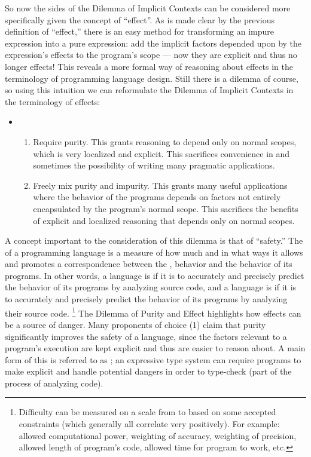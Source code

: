 So now the sides of the Dilemma of Implicit Contexts can be considered more specifically given the concept of ``effect''.
As is made clear by the previous definition of ``effect,'' there is an easy method for transforming an impure expression into a pure expression: add the implicit factors depended upon by the expression's effects to the program's scope --- now they are explicit and thus no longer effects!
This reveals a more formal way of reasoning about effects in the terminology of programming language design.
Still there is a dilemma of course, so using this intuition we can reformulate the Dilemma of Implicit Contexts in the terminology of effects:

\begin{itemize}
\item[] 
\begin{enumerate}
  \item[(1)]
  Require purity.
  This grants reasoning to depend only on normal scopes, which is very localized and explicit.
  This sacrifices convenience in and sometimes the possibility of writing many pragmatic applications.

  \item[(2)]
  Freely mix purity and impurity.
  This grants many useful applications where the behavior of the programs depends on factors not entirely encapsulated by the program's normal scope.
  This sacrifices the benefits of explicit and localized reasoning that depends only on normal scopes.
\end{enumerate}
\end{itemize}

A concept important to the consideration of this dilemma is that of ``safety.''
The  of a programming language is a measure of how much and in what  ways it allows and promotes a correspondence between the ,  behavior and the  behavior of its programs.
In other words,
a language is  if it is  to accurately and precisely predict the behavior of its programs by analyzing source code, and
a language is  if it is  to accurately and precisely predict the behavior of its programs by analyzing their source code.%
\footnote{
  Difficulty can be measured on a scale from  to  based on some accepted constraints (which generally all correlate very positively).
  For example: allowed computational power, weighting of accuracy, weighting of precision, allowed length of program's code, allowed time for program to work, etc.
}
The Dilemma of Purity and Effect highlights how effects can be a source of danger.
Many proponents of choice (1) claim that purity significantly improves the safety of a language, since the factors relevant to a program's execution are kept explicit and thus are easier to reason about.
A main form of this is referred to as ;
an expressive type system can require programs to make explicit and handle potential dangers in order to type-check (part of the process of analyzing code).

